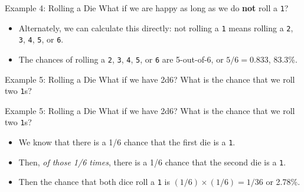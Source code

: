 \begin{frame}{Example 4: Rolling a Die}
    What if we are happy as long as we do \textbf{not} roll a \texttt{1}?
    \begin{itemize}
        \item Alternately, we can calculate this directly: not rolling a \texttt{1} means rolling a \texttt{2}, \texttt{3}, \texttt{4}, \texttt{5}, or \texttt{6}.
        \item The chances of rolling a \texttt{2}, \texttt{3}, \texttt{4}, \texttt{5}, or \texttt{6} are 5-out-of-6, or $5/6=0.833$, 83.3\%.
    \end{itemize}
\end{frame}

\begin{frame}{Example 5: Rolling a Die}
    What if we have 2d6? What is the chance that we roll two \texttt{1}s?
\end{frame}

\begin{frame}{Example 5: Rolling a Die}
    What if we have 2d6? What is the chance that we roll two \texttt{1}s?
    \begin{itemize}
        \item We know that there is a 1/6 chance that the first die is a \texttt{1}.
        \item Then, \textit{of those 1/6 times}, there is a 1/6 chance that the second die is a \texttt{1}.
        \item Then the chance that both dice roll a \texttt{1} is $(1/6)\times(1/6)=1/36$ or 2.78\%.
    \end{itemize}
\end{frame}

